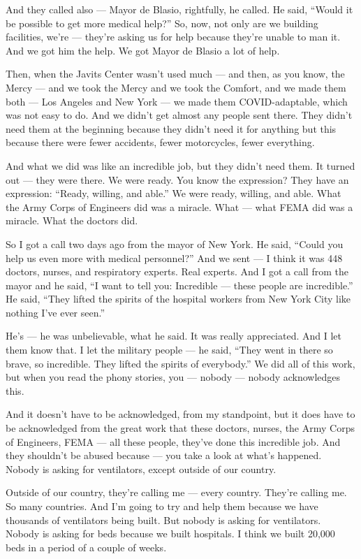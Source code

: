 And they called also --- Mayor de Blasio, rightfully, he called. He
said, ``Would it be possible to get more medical help?'' So, now, not
only are we building facilities, we're --- they're asking us for help
because they're unable to man it. And we got him the help. We got Mayor
de Blasio a lot of help.

Then, when the Javits Center wasn't used much --- and then, as you know,
the Mercy --- and we took the Mercy and we took the Comfort, and we made
them both --- Los Angeles and New York --- we made them COVID-adaptable,
which was not easy to do. And we didn't get almost any people sent
there. They didn't need them at the beginning because they didn't need
it for anything but this because there were fewer accidents, fewer
motorcycles, fewer everything.

And what we did was like an incredible job, but they didn't need them.
It turned out --- they were there. We were ready. You know the
expression? They have an expression: ``Ready, willing, and able.'' We
were ready, willing, and able. What the Army Corps of Engineers did was
a miracle. What --- what FEMA did was a miracle. What the doctors did.

So I got a call two days ago from the mayor of New York. He said,
``Could you help us even more with medical personnel?'' And we sent ---
I think it was 448 doctors, nurses, and respiratory experts. Real
experts. And I got a call from the mayor and he said, ``I want to tell
you: Incredible --- these people are incredible.'' He said, ``They
lifted the spirits of the hospital workers from New York City like
nothing I've ever seen.''

He's --- he was unbelievable, what he said. It was really appreciated.
And I let them know that. I let the military people --- he said, ``They
went in there so brave, so incredible. They lifted the spirits of
everybody.'' We did all of this work, but when you read the phony
stories, you --- nobody --- nobody acknowledges this.

And it doesn't have to be acknowledged, from my standpoint, but it does
have to be acknowledged from the great work that these doctors, nurses,
the Army Corps of Engineers, FEMA --- all these people, they've done
this incredible job. And they shouldn't be abused because --- you take a
look at what's happened. Nobody is asking for ventilators, except
outside of our country.

Outside of our country, they're calling me --- every country. They're
calling me. So many countries. And I'm going to try and help them
because we have thousands of ventilators being built. But nobody is
asking for ventilators. Nobody is asking for beds because we built
hospitals. I think we built 20,000 beds in a period of a couple of
weeks.

